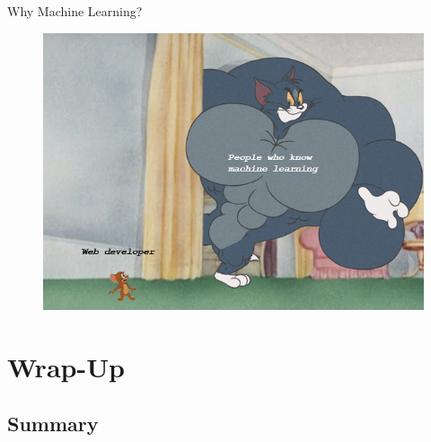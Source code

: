 \begin{frame}{Why Machine Learning?}{}
	\begin{figure}
		\centering
		\includegraphics[scale=0.4]{01_intro_ml/02_img/why_machine_learning}
	\end{figure}
\end{frame}


\section{Wrap-Up}

\subsection{Summary}

